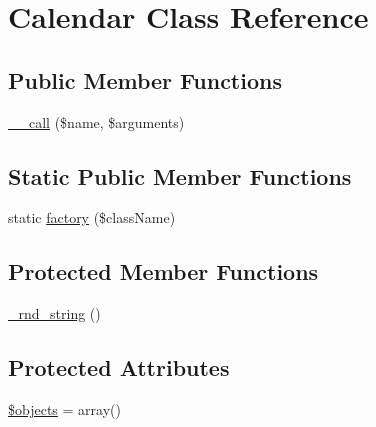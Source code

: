 \hypertarget{classCalendar}{
\section{Calendar Class Reference}
\label{classCalendar}
}
\subsection*{Public Member Functions}
\begin{DoxyCompactItemize}
\item 
\hyperlink{classCalendar_a3815af62ed9d37b2dcaa175379bbfeca}{\_\-\_\-call} (\$name, \$arguments)
\end{DoxyCompactItemize}
\subsection*{Static Public Member Functions}
\begin{DoxyCompactItemize}
\item 
static \hyperlink{classCalendar_a8c0508f1ea0fe72c8d0e6e8dd2a1c41c}{factory} (\$className)
\end{DoxyCompactItemize}
\subsection*{Protected Member Functions}
\begin{DoxyCompactItemize}
\item 
\hyperlink{classCalendar_a1ff6b5b97cfc56fb8fde66a6a86e97b9}{\_\-rnd\_\-string} ()
\end{DoxyCompactItemize}
\subsection*{Protected Attributes}
\begin{DoxyCompactItemize}
\item 
\hyperlink{classCalendar_a255f6b6db4c45b1418e9c15cf4e2bcdd}{\$objects} = array()
\end{DoxyCompactItemize}


